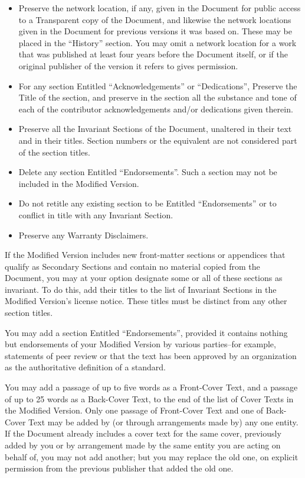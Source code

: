\begin{itemize}
\item[J.]
   Preserve the network location, if any, given in the Document for
   public access to a Transparent copy of the Document, and likewise
   the network locations given in the Document for previous versions
   it was based on.  These may be placed in the ``History'' section.
   You may omit a network location for a work that was published at
   least four years before the Document itself, or if the original
   publisher of the version it refers to gives permission.
   
\item[K.]
   For any section Entitled ``Acknowledgements'' or ``Dedications'',
   Preserve the Title of the section, and preserve in the section all
   the substance and tone of each of the contributor acknowledgements
   and/or dedications given therein.
   
\item[L.]
   Preserve all the Invariant Sections of the Document,
   unaltered in their text and in their titles.  Section numbers
   or the equivalent are not considered part of the section titles.
   
\item[M.]
   Delete any section Entitled ``Endorsements''.  Such a section
   may not be included in the Modified Version.
   
\item[N.]
   Do not retitle any existing section to be Entitled ``Endorsements''
   or to conflict in title with any Invariant Section.
   
\item[O.]
   Preserve any Warranty Disclaimers.
\end{itemize}

If the Modified Version includes new front-matter sections or
appendices that qualify as Secondary Sections and contain no material
copied from the Document, you may at your option designate some or all
of these sections as invariant.  To do this, add their titles to the
list of Invariant Sections in the Modified Version's license notice.
These titles must be distinct from any other section titles.

You may add a section Entitled ``Endorsements'', provided it contains
nothing but endorsements of your Modified Version by various
parties--for example, statements of peer review or that the text has
been approved by an organization as the authoritative definition of a
standard.

You may add a passage of up to five words as a Front-Cover Text, and a
passage of up to 25 words as a Back-Cover Text, to the end of the list
of Cover Texts in the Modified Version.  Only one passage of
Front-Cover Text and one of Back-Cover Text may be added by (or
through arrangements made by) any one entity.  If the Document already
includes a cover text for the same cover, previously added by you or
by arrangement made by the same entity you are acting on behalf of,
you may not add another; but you may replace the old one, on explicit
permission from the previous publisher that added the old one.


